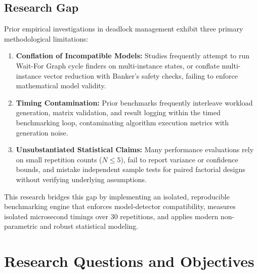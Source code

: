 \documentclass[11pt,a4paper]{article}
\begin{document}
\subsection{Research Gap}
Prior empirical investigations in deadlock management exhibit three primary methodological limitations:
\begin{enumerate}
    \item \textbf{Conflation of Incompatible Models:} Studies frequently attempt to run Wait-For Graph cycle finders on multi-instance states, or conflate multi-instance vector reduction with Banker's safety checks, failing to enforce mathematical model validity.
    \item \textbf{Timing Contamination:} Prior benchmarks frequently interleave workload generation, matrix validation, and result logging within the timed benchmarking loop, contaminating algorithm execution metrics with generation noise.
    \item \textbf{Unsubstantiated Statistical Claims:} Many performance evaluations rely on small repetition counts ($N \le 5$), fail to report variance or confidence bounds, and mistake independent sample tests for paired factorial designs without verifying underlying assumptions.
\end{enumerate}
This research bridges this gap by implementing an isolated, reproducible benchmarking engine that enforces model-detector compatibility, measures isolated microsecond timings over 30 repetitions, and applies modern non-parametric and robust statistical modeling.

\section{Research Questions and Objectives}
\end{document}
